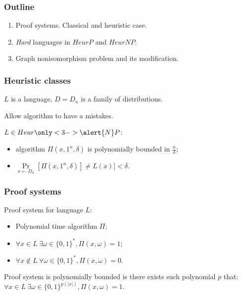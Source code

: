 \begin{frame}
    \frametitle{Outline}

    \begin{enumerate}
	    \item Proof systems. Classical and heuristic case.
    	\item \textit{Hard} languages in $HeurP$ and $HeurNP$.
    	\item Graph nonisomorphism problem and its modification.
    \end{enumerate}
\end{frame}


\begin{frame}
    \frametitle{Heuristic classes}

    $L$ is a language, $D = {D_n}$ is a family of distributions.

    Allow algorithm to have a mistakes.

    \pause
    \begin{definition}
        $L \in Heur\only<3->{\alert{N}}P$:
        \begin{itemize}
            \item {} 
		        algorithm $\Pi(x, 1^n, \delta)$ is polynomially bounded in
                $\frac{n}{\delta}$;
            \item $\Pr\limits_{x \gets D_n}[\Pi(x, 1^n, \delta)] \neq
        		L(x)] < \delta$.
        \end{itemize}
    \end{definition}
\end{frame}


\begin{frame}
	\frametitle{Proof systems}

    \begin{definition}
        Proof system for language $L$:
        \begin{itemize}
            \item Polynomial time algorithm $\Pi$;
            \item $\forall x \in L~ \exists \omega \in \{0, 1\}^{*}, \Pi(x, \omega) = 1$;
        	\item $\forall x \notin L~ \forall \omega \in \{0, 1\}^{*}, 
        		\Pi(x, \omega) = 0$.
        \end{itemize}
    \end{definition}

    \pause
    Proof system is polynomially bounded is there exists such polynomial $p$ that:
    $\forall x \in L~ \exists \omega \in \{0, 1\}^{p(|x|)}, \Pi(x, \omega) = 1$.

\end{frame}


